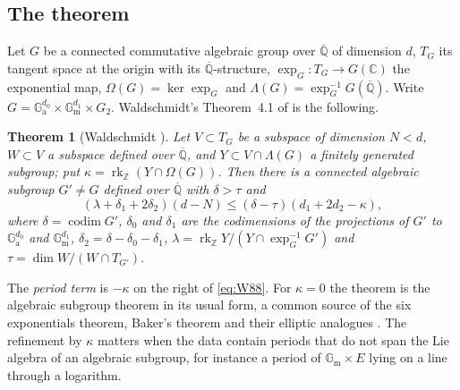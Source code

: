 \documentclass[11pt]{amsart}
\newtheorem{theorem}{Theorem}[section]
\theoremstyle{definition}
\theoremstyle{remark}
\numberwithin{equation}{section}
\newcommand{\ZZ}{\mathbb{Z}}
\newcommand{\CC}{\mathbb{C}}
\newcommand{\Qbar}{\overline{\mathbb{Q}}}
\newcommand{\Ga}{\mathbb{G}_{\mathrm{a}}}
\newcommand{\Gm}{\mathbb{G}_{\mathrm{m}}}
\newcommand{\rk}{\operatorname{rk}}
\newcommand{\codim}{\operatorname{codim}}
\begin{document}
\subsection{The theorem}
Let $G$ be a connected commutative algebraic group over $\Qbar$ of dimension $d$, $T_G$ its tangent
space at the origin with its $\Qbar$-structure, $\exp_G\colon T_G\to G(\CC)$ the exponential map,
$\Omega(G)=\ker\exp_G$ and $\Lambda(G)=\exp_G^{-1}G(\Qbar)$. Write $G=\Ga^{d_0}\times\Gm^{d_1}\times G_2$.
Waldschmidt's Theorem~4.1 of \cite{W88} is the following.

\begin{theorem}[{Waldschmidt \cite[Thm.~4.1, pp.~385--386]{W88}}]\label{thm:W88}
Let $V\subset T_G$ be a subspace of dimension $N<d$, $W\subset V$ a subspace defined over $\Qbar$, and
$Y\subset V\cap\Lambda(G)$ a finitely generated subgroup; put $\kappa=\rk_\ZZ(Y\cap\Omega(G))$. Then
there is a connected algebraic subgroup $G'\ne G$ defined over $\Qbar$ with $\delta>\tau$ and
\begin{equation}\label{eq:W88}
(\lambda+\delta_1+2\delta_2)(d-N)\le(\delta-\tau)(d_1+2d_2-\kappa),
\end{equation}
where $\delta=\codim G'$, $\delta_0$ and $\delta_1$ are the codimensions of the projections of $G'$ to
$\Ga^{d_0}$ and $\Gm^{d_1}$, $\delta_2=\delta-\delta_0-\delta_1$, $\lambda=\rk_\ZZ Y/(Y\cap\exp_G^{-1}G')$ and
$\tau=\dim W/(W\cap T_{G'})$.
\end{theorem}

The \emph{period term} is $-\kappa$ on the right of \eqref{eq:W88}. For $\kappa=0$ the theorem is
the algebraic subgroup theorem in its usual form, a common source of the six exponentials theorem,
Baker's theorem and their elliptic analogues \cite{WaldschmidtLIL,DALAG}. The refinement by $\kappa$
matters when the data contain periods that do not span the Lie algebra of an algebraic subgroup,
for instance a period of $\Gm\times E$ lying on a line through a logarithm.
\end{document}

